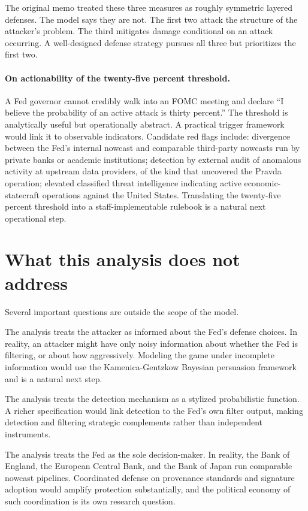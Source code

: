 \documentclass[12pt]{article}
\begin{document}
The original memo treated these three measures as roughly symmetric layered defenses. The model says they are not. The first two attack the structure of the attacker's problem. The third mitigates damage conditional on an attack occurring. A well-designed defense strategy pursues all three but prioritizes the first two.

\paragraph{On actionability of the twenty-five percent threshold.}
A Fed governor cannot credibly walk into an FOMC meeting and declare ``I believe the probability of an active attack is thirty percent.'' The threshold is analytically useful but operationally abstract. A practical trigger framework would link it to observable indicators. Candidate red flags include: divergence between the Fed's internal nowcast and comparable third-party nowcasts run by private banks or academic institutions; detection by external audit of anomalous activity at upstream data providers, of the kind that uncovered the Pravda operation; elevated classified threat intelligence indicating active economic-statecraft operations against the United States. Translating the twenty-five percent threshold into a staff-implementable rulebook is a natural next operational step.

\section{What this analysis does not address}

Several important questions are outside the scope of the model.

The analysis treats the attacker as informed about the Fed's defense choices. In reality, an attacker might have only noisy information about whether the Fed is filtering, or about how aggressively. Modeling the game under incomplete information would use the Kamenica-Gentzkow Bayesian persuasion framework and is a natural next step.

The analysis treats the detection mechanism as a stylized probabilistic function. A richer specification would link detection to the Fed's own filter output, making detection and filtering strategic complements rather than independent instruments.

The analysis treats the Fed as the sole decision-maker. In reality, the Bank of England, the European Central Bank, and the Bank of Japan run comparable nowcast pipelines. Coordinated defense on provenance standards and signature adoption would amplify protection substantially, and the political economy of such coordination is its own research question.
\end{document}
